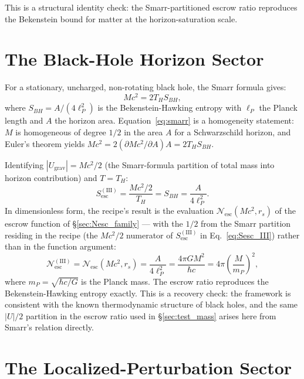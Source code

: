 \documentclass[11pt]{article}
\begin{document}
This is a structural identity check: the Smarr-partitioned escrow ratio reproduces the Bekenstein bound for matter at the horizon-saturation scale.

\section{The Black-Hole Horizon Sector}
\label{sec:BH}

For a stationary, uncharged, non-rotating black hole, the Smarr formula \cite{Smarr1973} gives:
\begin{equation}
Mc^2 = 2 T_H S_{BH},
\label{eq:smarr}
\end{equation}
where $S_{BH} = A/(4\ell_P^2)$ is the Bekenstein-Hawking entropy with $\ell_P$ the Planck length and $A$ the horizon area. Equation~\ref{eq:smarr} is a homogeneity statement: $M$ is homogeneous of degree $1/2$ in the area $A$ for a Schwarzschild horizon, and Euler's theorem yields $Mc^2 = 2 (\partial M c^2 / \partial A) A = 2 T_H S_{BH}$.

Identifying $|U_{\mathrm{grav}}| = Mc^2/2$ (the Smarr-formula partition of total mass into horizon contribution) and $T = T_H$:
\begin{equation}
S_{\mathrm{esc}}^{\mathrm{(III)}} = \frac{Mc^2/2}{T_H} = S_{BH} = \frac{A}{4\ell_P^2}.
\label{eq:Sesc_III}
\end{equation}
In dimensionless form, the recipe's result is the evaluation $\mathcal{N}_{\mathrm{esc}}(Mc^2, r_s)$ of the escrow function of \S\ref{sec:Nesc_family} — with the $1/2$ from the Smarr partition residing in the recipe (the $Mc^2/2$ numerator of $S_{\mathrm{esc}}^{(\mathrm{III})}$ in Eq.~\ref{eq:Sesc_III}) rather than in the function argument:
\begin{equation}
\mathcal{N}_{\mathrm{esc}}^{\mathrm{(III)}} = \mathcal{N}_{\mathrm{esc}}\!\left(Mc^2, r_s\right) = \frac{A}{4\ell_P^2} = \frac{4\pi G M^2}{\hbar c} = 4\pi\left(\frac{M}{m_P}\right)^{\!2},
\label{eq:Nesc_III}
\end{equation}
where $m_P = \sqrt{\hbar c/G}$ is the Planck mass. The escrow ratio reproduces the Bekenstein-Hawking entropy exactly. This is a recovery check: the framework is consistent with the known thermodynamic structure of black holes, and the same $|U|/2$ partition in the escrow ratio used in \S\ref{sec:test_mass} arises here from Smarr's relation directly.

\section{The Localized-Perturbation Sector}
\label{sec:localized}
\end{document}
